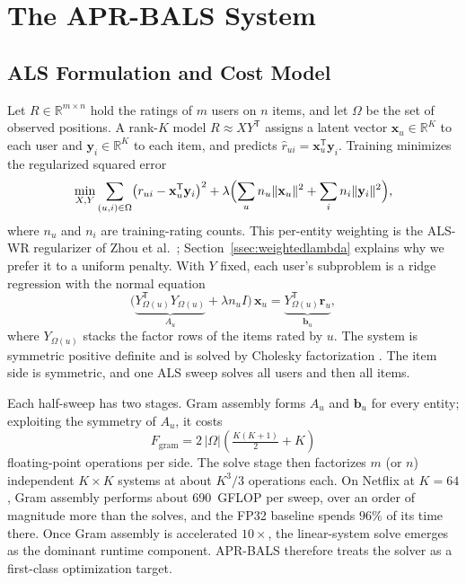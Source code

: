 \section{The APR-BALS System}
\label{sec:method}

\subsection{ALS Formulation and Cost Model}
\label{ssec:formulation}

Let $R \in \mathbb{R}^{m \times n}$ hold the ratings of $m$ users on $n$ items, and let $\Omega$ be the set of observed positions. A rank-$K$ model $R \approx XY^{\mathsf{T}}$ assigns a latent vector $\mathbf{x}_u \in \mathbb{R}^{K}$ to each user and $\mathbf{y}_i \in \mathbb{R}^{K}$ to each item, and predicts $\hat{r}_{ui} = \mathbf{x}_u^{\mathsf{T}}\mathbf{y}_i$. Training minimizes the regularized squared error
\begin{equation}
\min_{X,Y} \sum_{(u,i)\in\Omega} \bigl( r_{ui} - \mathbf{x}_u^{\mathsf{T}} \mathbf{y}_i \bigr)^{2}
+ \lambda \Bigl( \sum_{u} n_u \lVert \mathbf{x}_u \rVert^{2} + \sum_{i} n_i \lVert \mathbf{y}_i \rVert^{2} \Bigr),
\label{eq:mf_objective}
\end{equation}
where $n_u$ and $n_i$ are training-rating counts. This per-entity weighting is the ALS-WR regularizer of Zhou et al.\ \cite{zhou2008largescale}; Section~\ref{ssec:weightedlambda} explains why we prefer it to a uniform penalty. With $Y$ fixed, each user's subproblem is a ridge regression with the normal equation
\begin{equation}
\bigl( \underbrace{Y_{\Omega(u)}^{\mathsf{T}} Y_{\Omega(u)}}_{A_u} + \lambda n_u I \bigr)\, \mathbf{x}_u = \underbrace{Y_{\Omega(u)}^{\mathsf{T}} \mathbf{r}_u}_{\mathbf{b}_u},
\label{eq:als_update}
\end{equation}
where $Y_{\Omega(u)}$ stacks the factor rows of the items rated by $u$. The system is symmetric positive definite and is solved by Cholesky factorization \cite{golub2013matrix}. The item side is symmetric, and one ALS sweep solves all users and then all items.

Each half-sweep has two stages. Gram assembly forms $A_u$ and $\mathbf{b}_u$ for every entity; exploiting the symmetry of $A_u$, it costs
\begin{equation}
F_{\text{gram}} = 2\,|\Omega| \left( \tfrac{K(K+1)}{2} + K \right)
\label{eq:gram_flops}
\end{equation}
floating-point operations per side. The solve stage then factorizes $m$ (or $n$) independent $K \times K$ systems at about $K^{3}/3$ operations each. On Netflix at $K=64$, Gram assembly performs about 690~GFLOP per sweep, over an order of magnitude more than the solves, and the FP32 baseline\cite{chen2021bals} spends $96\%$ of its time there. Once Gram assembly is accelerated $10 \times$, the linear-system solve emerges as the dominant runtime component. APR-BALS therefore treats the solver as a first-class optimization target.

